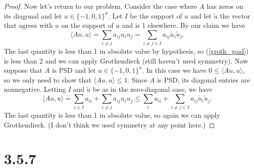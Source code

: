 \documentclass[11pt,letterpaper]{report}
\begin{document}
\begin{proof}
	Now let's return to our problem. Consider the case where $A$ has zeros on its diagonal and let $u\in \{-1, 0, 1\}^n$. Let $I$ be the support of $u$ and let $\tilde{u}$ the vector that agrees with $u$ on the support of $u$ and is 1 elsewhere. By our claim we have
	\[
	\langle Au, u\rangle = \sum_{i\neq j}a_{ij}u_iu_j = \sum_{i\neq j\in I}a_{ij}\tilde{u}_i\tilde{u}_j.
	\]
	The last quantity is less than 1 in absolute value by hypothesis, so (\ref{groth_goal}) is less than 2 and we can apply Grothendieck (still haven't used symmetry). Now suppose that $A$ is PSD and let $u\in \{-1, 0, 1\}^n$. In this case we have $0\leq \langle Au, u\rangle$, so we only need to show that $\langle Au, u\rangle \leq 1$. Since $A$ is PSD, its diagonal entries are nonnegative. Letting $I$ and $\tilde{u}$ be as in the zero-diagonal case, we have
	\[
	\langle Au, u\rangle= \sum_{i\in I}a_{ii} + \sum_{i\neq j}a_{ij}u_iu_j \leq \sum_ia_{ii} + \sum_{i\neq j\in I}a_{ij}\tilde{u}_i\tilde{u}_j.
	\]
	The last quantity is less than 1 in absolute value, so again we can apply Grothendieck. (I don't think we used symmetry at any point here.)

\end{proof}










\section*{3.5.7}
\newcommand{\sign}{\text{sign}}
\end{document}
